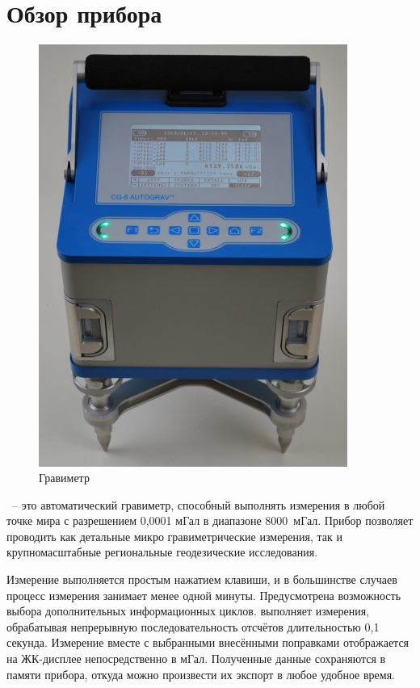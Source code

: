 \chapter[Обзор]{Обзор прибора}
\label{chap:instrument_overview}

\begin{figure}[h]
  \centering
  \includegraphics[width=0.9\textwidth, height=0.5\textheight, keepaspectratio]
  {figures/cg6_autograv}
  \caption{Гравиметр \cg{}}
  \label{fig:cg6_autograv_gravity_meter}
\end{figure}

\cg{}~-- это автоматический гравиметр, способный выполнять измерения в любой
точке мира с разрешением 0,0001 мГал в диапазоне 8000~мГал. Прибор позволяет
проводить как детальные микро гравиметрические измерения, так и крупномасштабные
региональные геодезические исследования.

Измерение выполняется простым нажатием клавиши, и в большинстве случаев процесс
измерения занимает менее одной минуты. Предусмотрена возможность выбора
дополнительных информационных циклов. \cg{} выполняет измерения,
обрабатывая непрерывную последовательность отсчётов длительностью 0,1 секунда.
Измерение вместе с выбранными внесёнными поправками отображается на ЖК-дисплее
непосредственно в мГал. Полученные данные сохраняются в памяти прибора, откуда
можно произвести их экспорт в любое удобное время.

